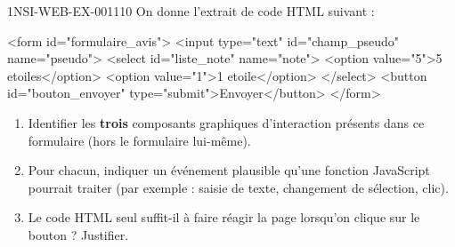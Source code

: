 \begin{exercice}{1NSI-WEB-EX-001}{1}{10}
On donne l'extrait de code HTML suivant :
\begin{console}
<form id="formulaire_avis">
    <input type="text" id="champ_pseudo" name="pseudo">
    <select id="liste_note" name="note">
        <option value="5">5 etoiles</option>
        <option value="1">1 etoile</option>
    </select>
    <button id="bouton_envoyer" type="submit">Envoyer</button>
</form>
\end{console}
\begin{enumerate}
  \item Identifier les \textbf{trois} composants graphiques d'interaction présents dans ce formulaire (hors le formulaire lui-même).
  \item Pour chacun, indiquer un événement plausible qu'une fonction JavaScript pourrait traiter (par exemple : saisie de texte, changement de sélection, clic).
  \item Le code HTML seul suffit-il à faire réagir la page lorsqu'on clique sur le bouton ? Justifier.
\end{enumerate}
\end{exercice}
